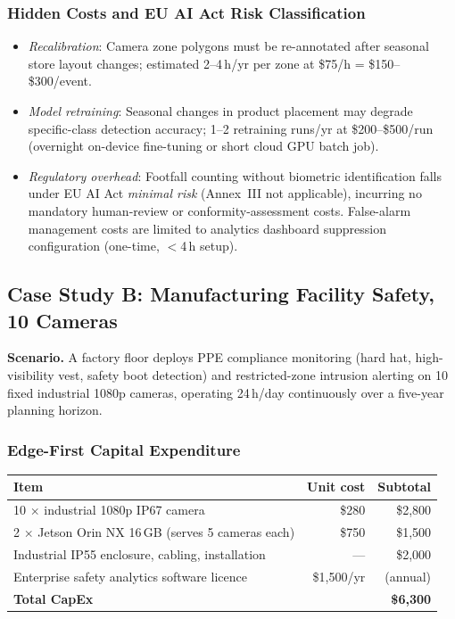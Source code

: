 \documentclass[11pt,a4paper]{article}
\begin{document}
\subsubsection*{Hidden Costs and EU AI Act Risk Classification}

\begin{itemize}[leftmargin=*, noitemsep]
  \item \textit{Recalibration}: Camera zone polygons must be
    re-annotated after seasonal store layout changes; estimated
    2--4\,h/yr per zone at \$75/h = \$150--\$300/event.
  \item \textit{Model retraining}: Seasonal changes in product
    placement may degrade specific-class detection accuracy;
    1--2 retraining runs/yr at \$200--\$500/run (overnight
    on-device fine-tuning or short cloud GPU batch job).
  \item \textit{Regulatory overhead}: Footfall counting without
    biometric identification falls under EU AI Act
    \emph{minimal risk} (Annex~III not applicable), incurring
    no mandatory human-review or conformity-assessment costs.
    False-alarm management costs are limited to analytics
    dashboard suppression configuration (one-time, $<$4\,h setup).
\end{itemize}

\subsection{Case Study B: Manufacturing Facility Safety, 10 Cameras}
\label{ssec:case_b}

\textbf{Scenario.} A factory floor deploys PPE compliance monitoring
(hard hat, high-visibility vest, safety boot detection) and
restricted-zone intrusion alerting on 10 fixed industrial 1080p
cameras, operating 24\,h/day continuously over a five-year
planning horizon.

\subsubsection*{Edge-First Capital Expenditure}

\begin{center}
\begin{tabular}{lrr}
  \toprule
  \textbf{Item} & \textbf{Unit cost} & \textbf{Subtotal} \\
  \midrule
  10 $\times$ industrial 1080p IP67 camera & \$280 & \$2,800 \\
  2 $\times$ Jetson Orin NX 16\,GB (serves 5 cameras each) & \$750 & \$1,500 \\
  Industrial IP55 enclosure, cabling, installation & --- & \$2,000 \\
  Enterprise safety analytics software licence & \$1,500/yr & (annual) \\
  \midrule
  \textbf{Total CapEx} & & \textbf{\$6,300} \\
  \bottomrule
\end{tabular}
\end{center}
\end{document}
